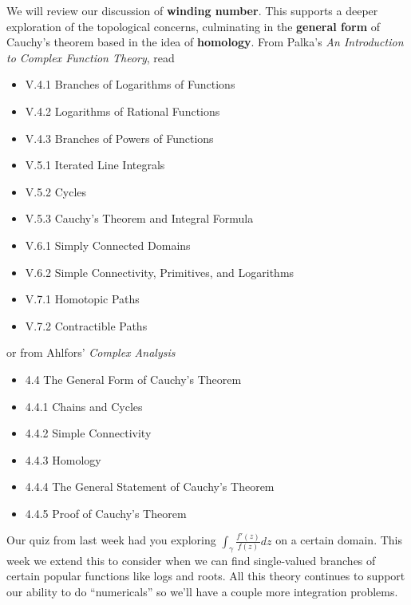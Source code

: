 \documentclass{homework}
\begin{document}
We will review our discussion of \textbf{winding number}.  This
supports a deeper exploration of the topological concerns, culminating
in the \textbf{general form} of Cauchy's theorem based in the idea of
\textbf{homology}.  From Palka's \textit{An Introduction to Complex
  Function Theory}, read
\begin{itemize}
\item V.4.1 Branches of Logarithms of Functions
\item V.4.2 Logarithms of Rational Functions
\item V.4.3 Branches of Powers of Functions
\item V.5.1 Iterated Line Integrals
\item V.5.2 Cycles
\item V.5.3 Cauchy's Theorem and Integral Formula
\item V.6.1 Simply Connected Domains
\item V.6.2 Simple Connectivity, Primitives, and Logarithms
\item V.7.1 Homotopic Paths
\item V.7.2 Contractible Paths
\end{itemize}
or from Ahlfors' \textit{Complex Analysis}
\begin{itemize}
\item 4.4 The General Form of Cauchy's Theorem
\item 4.4.1 Chains and Cycles
\item 4.4.2 Simple Connectivity
\item 4.4.3 Homology
\item 4.4.4 The General Statement of Cauchy's Theorem
\item 4.4.5 Proof of Cauchy's Theorem
\end{itemize}
Our quiz from last week had you exploring
$\int_\gamma \frac{f'(z)}{f(z)} dz$ on a certain domain.  This week we
extend this to consider when we can find single-valued branches of
certain popular functions like logs and roots.  All this theory
continues to support our ability to do ``numericals'' so we'll have a
couple more integration problems.
\end{document}
